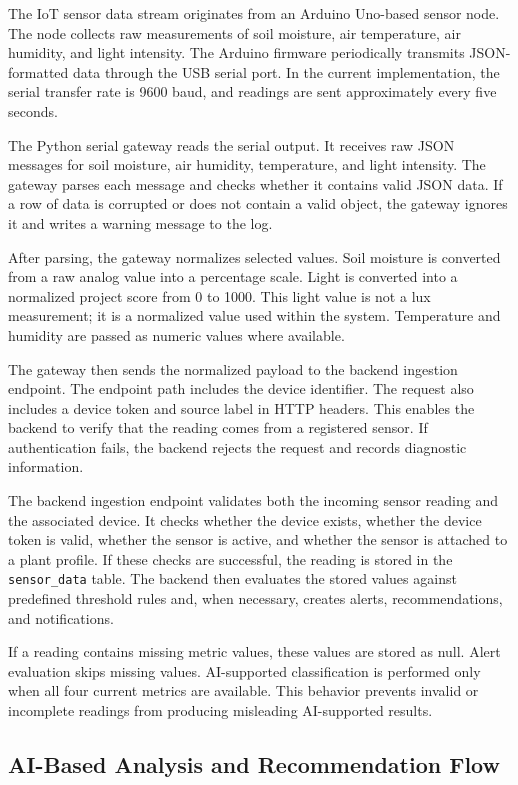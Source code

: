The IoT sensor data stream originates from an Arduino Uno-based sensor node. The node collects raw measurements of soil moisture, air temperature, air humidity, and light intensity. The Arduino firmware periodically transmits JSON-formatted data through the USB serial port. In the current implementation, the serial transfer rate is 9600 baud, and readings are sent approximately every five seconds.

The Python serial gateway reads the serial output. It receives raw JSON messages for soil moisture, air humidity, temperature, and light intensity. The gateway parses each message and checks whether it contains valid JSON data. If a row of data is corrupted or does not contain a valid object, the gateway ignores it and writes a warning message to the log.

After parsing, the gateway normalizes selected values. Soil moisture is converted from a raw analog value into a percentage scale. Light is converted into a normalized project score from 0 to 1000. This light value is not a lux measurement; it is a normalized value used within the system. Temperature and humidity are passed as numeric values where available.

The gateway then sends the normalized payload to the backend ingestion endpoint. The endpoint path includes the device identifier. The request also includes a device token and source label in HTTP headers. This enables the backend to verify that the reading comes from a registered sensor. If authentication fails, the backend rejects the request and records diagnostic information.

The backend ingestion endpoint validates both the incoming sensor reading and the associated device. It checks whether the device exists, whether the device token is valid, whether the sensor is active, and whether the sensor is attached to a plant profile. If these checks are successful, the reading is stored in the \texttt{sensor\_data} table. The backend then evaluates the stored values against predefined threshold rules and, when necessary, creates alerts, recommendations, and notifications.

If a reading contains missing metric values, these values are stored as null. Alert evaluation skips missing values. AI-supported classification is performed only when all four current metrics are available. This behavior prevents invalid or incomplete readings from producing misleading AI-supported results.

\subsection{AI-Based Analysis and Recommendation Flow}
\label{subsec:ai-analysis-recommendation-flow}

